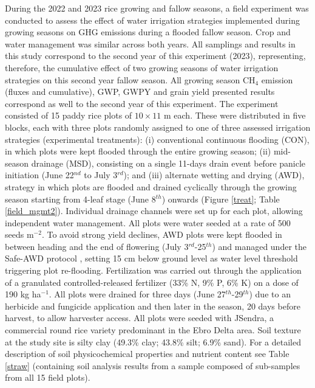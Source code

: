 During the 2022 and 2023 rice growing and fallow seasons, a field experiment was conducted to assess the effect of water irrigation strategies implemented during growing seasons on GHG emissions during a flooded fallow season. Crop and water management was similar across both years. All samplings and results in this study correspond to the second year of this experiment (2023), representing, therefore, the cumulative effect of two growing seasons of water irrigation strategies on this second year fallow season. All growing season CH$_{4}$ emission (fluxes and cumulative), GWP, GWPY and grain yield presented results correspond as well to the second year of this experiment. The experiment consisted of 15 paddy rice plots of $10 \times 11$ m each. These were distributed in five blocks, each with three plots randomly assigned to one of three assessed irrigation strategies (experimental treatments): (i) conventional continuous flooding (CON), in which plots were kept flooded through the entire growing season; (ii) mid-season drainage (MSD), consisting on a single 11-days drain event before panicle initiation (June 22$^{nd}$ to July 3$^{rd}$); and (iii) alternate wetting and drying (AWD), strategy in which plots are flooded and drained cyclically through the growing season starting from 4-leaf stage (June 8$^{th}$) onwards (Figure \ref{treat}; Table \ref{field_mgmt2}). Individual drainage channels were set up for each plot, allowing independent water management. All plots were water seeded at a rate of 500 seeds m$^{-2}$. To avoid strong yield declines, AWD plots were kept flooded in between heading and the end of flowering (July 3$^{rd}$-25$^{th}$) and managed under the Safe-AWD protocol \citep{bouman2007a}, setting 15 cm below ground level as water level threshold triggering plot re-flooding. Fertilization was carried out through the application of a granulated controlled-released fertilizer (33\% N, 9\% P, 6\% K) on a dose of 190 kg ha$^{-1}$. All plots were drained for three days (June 27$^{th}$-29$^{th}$) due to an herbicide and fungicide application and then later in the season, 20 days before harvest, to allow harvester access. All plots were seeded with JSendra, a commercial round rice variety predominant in the Ebro Delta area. Soil texture at the study site is silty clay (49.3\% clay; 43.8\% silt; 6.9\% sand). For a detailed description of soil physicochemical properties and nutrient content see Table \ref{straw} (containing soil analysis results from a sample composed of sub-samples from all 15 field plots).\\ 

